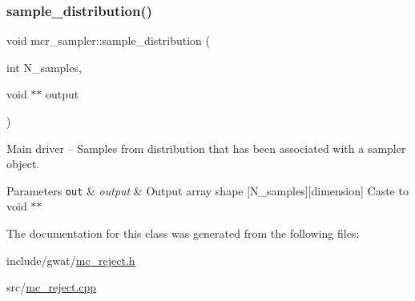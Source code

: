 \subsubsection{\texorpdfstring{sample\+\_\+distribution()}{sample\_distribution()}}
{\footnotesize\ttfamily void mcr\+\_\+sampler\+::sample\+\_\+distribution (\begin{DoxyParamCaption}\item[{int}]{N\+\_\+samples,  }\item[{void $\ast$$\ast$}]{output }\end{DoxyParamCaption})}



Main driver -- Samples from distribution that has been associated with a sampler object. 


\begin{DoxyParams}[1]{Parameters}
\mbox{\tt out}  & {\em output} & Output array shape \mbox{[}N\+\_\+samples\mbox{]}\mbox{[}dimension\mbox{]} Caste to void $\ast$$\ast$ \\
\hline
\end{DoxyParams}


The documentation for this class was generated from the following files\+:\begin{DoxyCompactItemize}
\item 
include/gwat/\hyperlink{mc__reject_8h}{mc\+\_\+reject.\+h}\item 
src/\hyperlink{mc__reject_8cpp}{mc\+\_\+reject.\+cpp}\end{DoxyCompactItemize}
